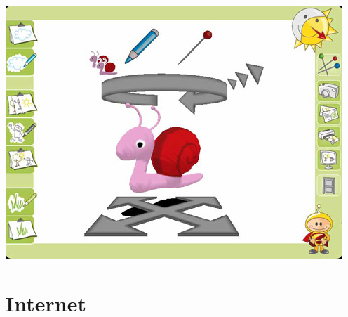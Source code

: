 \documentclass[notumble]{leaflet}
\begin{document}
\stImplementationDefinition

\pagebreak{}

\section{\stApplicationsTerm}

\stApplicationsDefinition

\begin{center}
  \includegraphics[width=.45\textwidth]{plopp}\\
  \stPloppDrawingSessionTerm
\end{center}

\begin{stGlossary}
\end{stGlossary}

\pagebreak{}

\section{\stBooksTerm}

\stBooksDefinition

\section{\stSmalltalkActionsTerm}

\stSmalltalkActionsDefinition

\section{Internet}

\stInternetWebsitesDefinition
\end{document}
